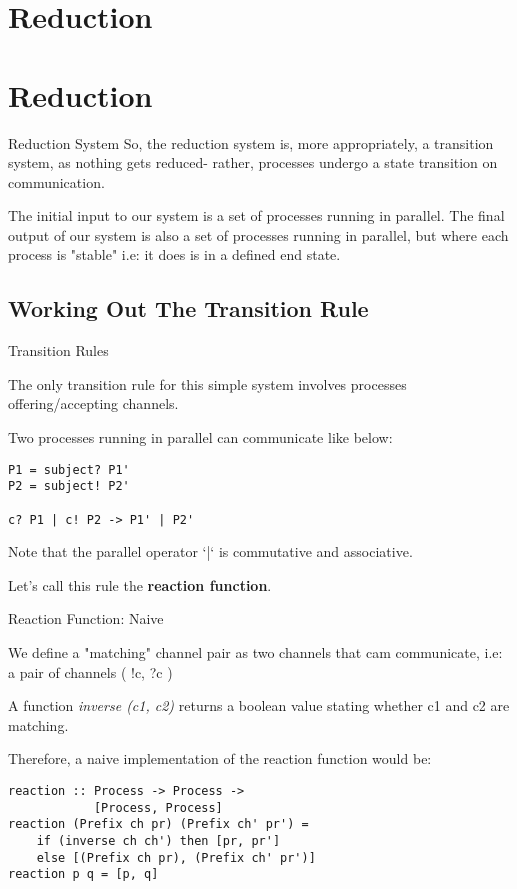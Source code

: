 \documentclass{article}
\begin{document}
\section{Reduction}

\section{Reduction}

\begin{frame}{Reduction System}
So, the reduction system is, more appropriately, a transition system, as nothing gets reduced- rather, processes undergo a state transition on communication.

The initial input to our system is a set of processes running in parallel. The final output of our system is also a set of processes running in parallel, but where each process is "stable" i.e: it does is in a defined end state.
\end{frame}

\subsection{Working Out The Transition Rule}

\begin{frame}[fragile]{Transition Rules}

The only transition rule for this simple system involves processes offering/accepting channels.

Two processes running in parallel can communicate like below:

\begin{lstlisting}
P1 = subject? P1'
P2 = subject! P2'

c? P1 | c! P2 -> P1' | P2'
\end{lstlisting}

Note that the parallel operator `|` is commutative and associative.

Let's call this rule the \textbf{reaction function}.
\end{frame}

\begin{frame}[fragile]{Reaction Function: Naive}

We define a "matching" channel pair as two channels that cam communicate, i.e: a pair of channels ( !c, ?c )

A function \textit{inverse (c1, c2)} returns a boolean value stating whether c1 and c2 are matching. 

Therefore, a naive implementation of the reaction function would be:

\begin{lstlisting}
reaction :: Process -> Process -> 
            [Process, Process]
reaction (Prefix ch pr) (Prefix ch' pr') = 
	if (inverse ch ch') then [pr, pr'] 
	else [(Prefix ch pr), (Prefix ch' pr')] 
reaction p q = [p, q]
\end{lstlisting}

\end{frame}
\end{document}
